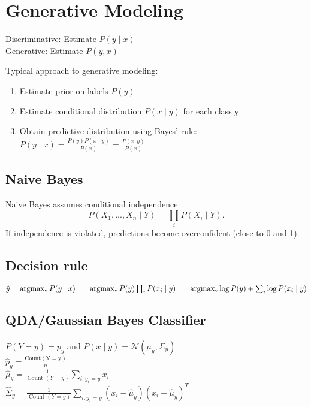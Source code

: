 \section*{Generative Modeling}
Discriminative: Estimate $P(y\mid x)$\\
Generative: Estimate $P(y,x)$

Typical approach to generative modeling:
\begin{enumerate}[noitemsep,leftmargin=6mm,topsep=2pt,parsep=2pt,partopsep=2pt]
    \item Estimate prior on labels $P(y)$
    \item Estimate conditional distribution $P(x\mid y)$ for each class y
    \item Obtain predictive distribution using Bayes' rule:
$P(y\mid x) = \frac{P(y) P(x\mid y)}{P(x)} = \frac{P(x,y)}{P(x)}$
\end{enumerate}

\subsection*{Naive Bayes}
Naive Bayes assumes conditional independence:
$$P(X_1,...,X_n\mid Y) = \prod_i P(X_i\mid Y).$$
If independence is violated, predictions become overconfident (close to 0 and 1).

\subsection*{Decision rule}
$\hat{y} = \operatorname{argmax_{y}} P(y\mid x)\\
\hspace*{2.1mm}= \operatorname{argmax_{y}} P(y) \prod_{i} P(x_i\mid y)\\
\hspace*{2.1mm}= \operatorname{argmax_{y}} \log P(y) + \sum_{i} \log P(x_i\mid y)$

\subsection*{QDA/Gaussian Bayes Classifier}
$P(Y=y) = p_y$ and $P(x\mid y) = \mathcal{N}({\mu}_y, {\Sigma}_y)$\\
$\hat{p}_y= \frac{\operatorname{Count(Y = y)}}{n}$\\
$\hat{\mu}_{y} = \frac{1}{\operatorname{Count}(Y=y)} \sum_{i:y_i=y} {x_i} $\\
$\hat{\Sigma}_{y} = \frac{1}{\operatorname{Count}(Y=y)} \sum_{i:y_i=y} (x_i - \hat{\mu}_{y})(x_i-\hat{\mu}_y)^T $

